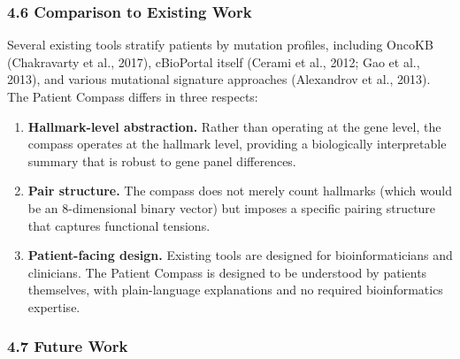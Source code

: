 \documentclass[
  11pt,
]{article}
\providecommand{\tightlist}{%
  \setlength{\itemsep}{0pt}\setlength{\parskip}{0pt}}
\begin{document}
\subsubsection{4.6 Comparison to Existing
Work}\label{comparison-to-existing-work}

Several existing tools stratify patients by mutation profiles, including
OncoKB (Chakravarty et al., 2017), cBioPortal itself (Cerami et al.,
2012; Gao et al., 2013), and various mutational signature approaches
(Alexandrov et al., 2013). The Patient Compass differs in three
respects:

\begin{enumerate}
\def\labelenumi{\arabic{enumi}.}
\tightlist
\item
  \textbf{Hallmark-level abstraction.} Rather than operating at the gene
  level, the compass operates at the hallmark level, providing a
  biologically interpretable summary that is robust to gene panel
  differences.
\item
  \textbf{Pair structure.} The compass does not merely count hallmarks
  (which would be an 8-dimensional binary vector) but imposes a specific
  pairing structure that captures functional tensions.
\item
  \textbf{Patient-facing design.} Existing tools are designed for
  bioinformaticians and clinicians. The Patient Compass is designed to
  be understood by patients themselves, with plain-language explanations
  and no required bioinformatics expertise.
\end{enumerate}

\subsubsection{4.7 Future Work}\label{future-work}
\end{document}
